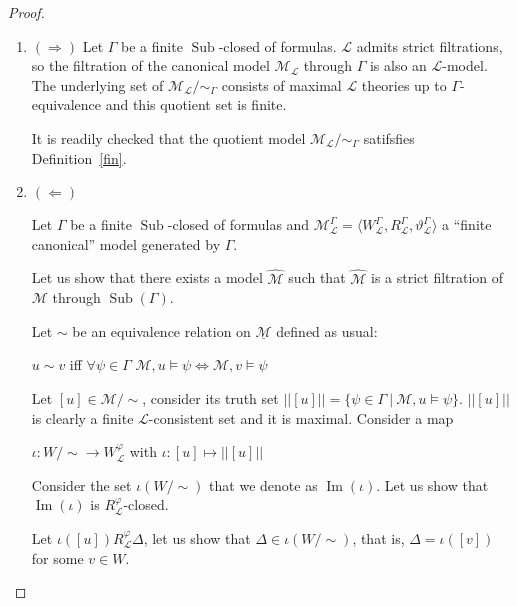 \documentclass[a4paper]{article}
\theoremstyle{defin}
\theoremstyle{theorem}
\theoremstyle{prop}
\theoremstyle{lemma}
\theoremstyle{fact}
\theoremstyle{ex}
\theoremstyle{col}
\begin{document}
\begin{proof}
  $ $

  \begin{enumerate}
    \item $(\Rightarrow)$
  Let $\Gamma$ be a finite $\operatorname{Sub}$-closed of formulas. $\mathcal{L}$ admits strict filtrations, so the filtration of the canonical model $\mathcal{M}_{\mathcal{L}}$ through $\Gamma$ is also an $\mathcal{L}$-model. The underlying set of $\mathcal{M}_{\mathcal{L}} / \sim_{\Gamma}$ consists of maximal $\mathcal{L}$ theories up to $\Gamma$-equivalence and this quotient set is finite.

  It is readily checked that the quotient model $\mathcal{M}_{\mathcal{L}} / \sim_{\Gamma}$ satifsfies Definition~\ref{fin}.

    \item $(\Leftarrow)$

    Let $\Gamma$ be a finite $\operatorname{Sub}$-closed of formulas and $\mathcal{M}_{\mathcal{L}}^{\Gamma} = \langle W_{\mathcal{L}}^{\Gamma}, R_{\mathcal{L}}^{\Gamma}, \vartheta_{\mathcal{L}}^{\Gamma} \rangle$ a ``finite canonical'' model generated by $\Gamma$.

    Let us show that there exists a model $\widehat{\mathcal{M}}$ such that
    $\widehat{\mathcal{M}}$ is a strict filtration of $\mathcal{M}$ through $\operatorname{Sub}(\Gamma)$.

    Let $\sim$ be an equivalence relation on $\underline{\mathcal{M}}$ defined as usual:

    \begin{center}
      $u \sim v$ iff $\forall \psi \in \Gamma$
      $\mathcal{M}, u \models \psi \Leftrightarrow \mathcal{M}, v \models \psi$
    \end{center}

    Let $[u] \in \mathcal{M}/\sim$, consider its truth set $||[u]|| = \{ \psi \in \Gamma \: | \: \mathcal{M}, u \models \psi \}$.
    $||[u]||$ is clearly a finite $\mathcal{L}$-consistent set and it is maximal.
    Consider a map
    \begin{center}
    $\iota : W/\sim \to W_{\mathcal{L}}^{\varphi}$ with $\iota : [u] \mapsto ||[u]||$
    \end{center}

    Consider the set $\iota(W/\sim)$ that we denote as $\operatorname{Im}(\iota)$. Let us show that $\operatorname{Im}(\iota)$ is $R_{\mathcal{L}}^{\varphi}$-closed.

    Let $\iota([u]) R_{\mathcal{L}}^{\varphi} \Delta$, let us show that $\Delta \in \iota(W/\sim)$, that is, $\Delta = \iota([v])$ for some $v \in W$.


\end{enumerate}
\end{proof}
\end{document}

